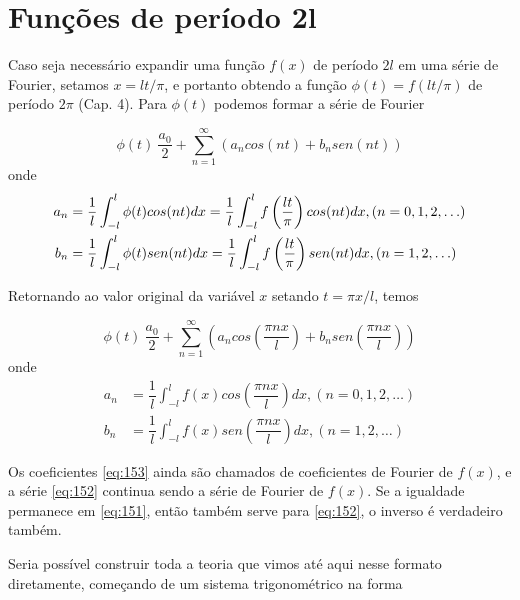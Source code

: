\chapter{Funções de período 2l}

Caso seja necessário expandir uma função $f(x)$ de período $2l$ em uma série de Fourier,
setamos $x = lt/\pi$, e portanto obtendo a função $\phi(t) = f(lt/\pi)$ de período $2\pi$
(Cap. 4). Para $\phi(t)$ podemos formar a série de Fourier

\begin{equation}
    \label{eq:151}
     \phi(t) ~ \dfrac{a_0}{2} + \sum\limits_{n=1}^{\infty}(a_n cos(nt) + b_n sen(nt))
\end{equation}
onde
\begin{equation}
\notag
    \begin{split}
        a_n &= \dfrac{1}{l}\int_{-l}^{l}\phi(t)cos(nt)dx = \dfrac{1}{l}\int_{-l}^{l}f\left(\dfrac{lt}{\pi}\right)cos(nt)dx, (n = 0, 1, 2, \ldots)\\
        b_n &= \dfrac{1}{l}\int_{-l}^{l}\phi(t)sen(nt)dx = \dfrac{1}{l}\int_{-l}^{l}f\left(\dfrac{lt}{\pi}\right)sen(nt)dx, (n = 1, 2, \ldots)
    \end{split}
\end{equation}

Retornando ao valor original da variável $x$ setando $t = \pi x/l$, temos

\begin{equation}
\label{eq:152}
    \phi(t) ~ \dfrac{a_0}{2} + \sum\limits_{n=1}^{\infty}\left(a_n cos\left(\dfrac{\pi nx}{l}\right) + b_n sen\left(\dfrac{\pi nx}{l}\right)\right)
\end{equation}
onde 
\begin{equation}
\label{eq:153}
    \begin{split}
        a_n &= \dfrac{1}{l}\int_{-l}^{l}f(x)cos\left(\dfrac{\pi nx}{l}\right)dx, (n = 0, 1, 2, \ldots)\\
        b_n &= \dfrac{1}{l}\int_{-l}^{l}f(x)sen\left(\dfrac{\pi nx}{l}\right)dx, (n = 1, 2, \ldots)
    \end{split}
\end{equation}

Os coeficientes \ref{eq:153} ainda são chamados de coeficientes de Fourier de $f(x)$, e a série 
\ref{eq:152} continua sendo a série de Fourier de $f(x)$. Se a igualdade permanece em \ref{eq:151},
então também serve para \ref{eq:152}, o inverso é verdadeiro também.

Seria possível construir toda a teoria que vimos até aqui nesse formato diretamente, começando
de um sistema trigonométrico na forma 

